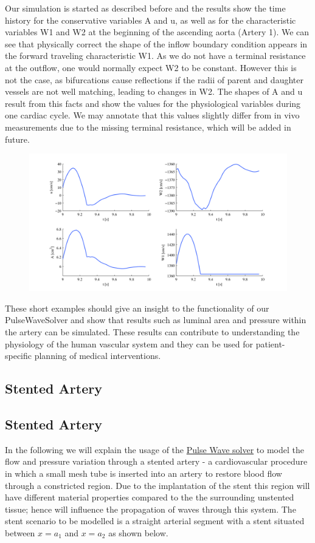 Our simulation is started as described before and the results show the time
history for the conservative variables A and u, as well as for the
characteristic variables W1 and W2 at the beginning of the ascending aorta
(Artery 1). We can see that physically correct the shape of the inflow boundary
condition appears in the forward traveling characteristic W1. As we do not have
a terminal resistance at the outflow, one would normally expect W2 to be
constant. However this is not the case, as bifurcations cause reflections if the
radii of parent and daughter vessels are not well matching, leading to changes
in W2. The shapes of A and u result from this facts and show the values for the
physiological variables during one cardiac cycle. We may annotate that this
values slightly differ from in vivo measurements due to the missing terminal
resistance, which will be added in future.

\begin{figure}
	\includegraphics[width=\linewidth]{img/Network_Results.png}
\end{figure}

These short examples should give an insight to the functionality of our
PulseWaveSolver and show that results such as luminal area and pressure within
the artery can be simulated. These results can contribute to understanding the
physiology of the human vascular system and they can be used for
patient-specific planning of medical interventions.



\subsection{Stented Artery}
\subsection{Stented Artery}
In the following we will explain the usage of the  \hyperref[PulseWaveSolver]{Pulse Wave solver} to model the flow and pressure variation through a stented artery - a cardiovascular procedure in which a small mesh tube is inserted into an artery to restore blood flow through a constricted region. Due to the implantation of the stent this region will have different material properties compared to the the surrounding unstented tissue; hence will influence the propagation of waves through this system. The stent scenario to be modelled is a straight arterial segment with a stent situated between $x=a_{1}$ and $x=a_{2}$ as shown below.

